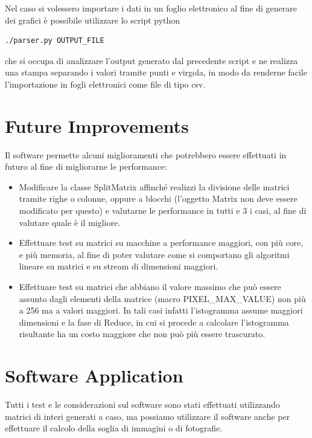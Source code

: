 \documentclass[a4paper,10pt]{article}
\begin{document}
Nel caso si volessero importare i dati in un foglio elettronico al fine di generare dei grafici \`e possibile utilizzare lo script python

\begin{lstlisting}
./parser.py OUTPUT_FILE
\end{lstlisting}

che si occupa di analizzare l'output generato dal precedente script e ne realizza una stampa separando i valori tramite punti e virgola, in modo da renderne facile l'importazione in fogli elettronici come file di tipo csv.

\section{Future Improvements}

Il software permette alcuni miglioramenti che potrebbero essere effettuati in futuro al fine di migliorarne le performance:

\begin{itemize}
\item Modificare la classe \textsf{SplitMatrix} affinch\'e realizzi la divisione delle matrici tramite righe o colonne, oppure a blocchi (l'oggetto \textsf{Matrix} non deve essere modificato per questo) e valutarne le performance in tutti e 3 i casi, al fine di valutare quale \`e il migliore.

\item Effettuare test su matrici su macchine a performance maggiori, con pi\`u core, e pi\`u memoria, al fine di poter valutare come si comportano gli algoritmi lineare su matrici e su stream di dimensioni maggiori.

\item Effettuare test su matrici che abbiano il valore massimo che pu\`o essere assunto dagli elementi della matrice (macro \textsf{PIXEL\_MAX\_VALUE}) non pi\`u a 256 ma a valori maggiori. In tali casi infatti l'istogramma assume maggiori dimensioni e la fase di \textsf{Reduce}, in cui si procede a calcolare l'istogramma risultante ha un costo maggiore che non pu\`o pi\`u essere trascurato.
\end{itemize}

\section{Software Application}

Tutti i test e le considerazioni sul software sono stati effettuati utilizzando matrici di interi generati a caso, ma possiamo utilizzare il software anche per effettuare il calcolo della soglia di immagini o di fotografie.
\end{document}
